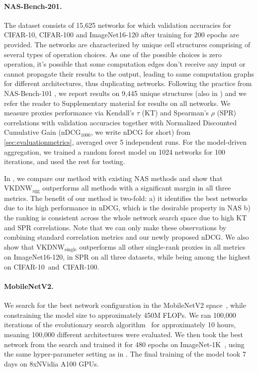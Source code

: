 \paragraph{NAS-Bench-201.} The dataset consists of 15,625 networks for which validation accuracies for CIFAR-10, CIFAR-100 \cite{krizhevsky2009learning} and ImageNet16-120 \cite{chrabaszcz2017downsampled} after training for 200 epochs are provided. The networks are characterized by unique cell structures comprising of several types of operation choices. As one of the possible choices is zero operation, it's possible that some computation edges don't receive any input or cannot propagate their results to the output, leading to same computation graphs for different architectures, thus duplicating networks. Following the practice from NAS-Bench-101 \cite{ying2019bench}, we report results on 9,445 unique structures (also in \cite{mehrotra2021bench, kadlecova2024surprisingly}) and we refer the reader to Supplementary material for results on all networks. 
We measure proxies performance via Kendall’s $\tau$ (KT) and Spearman's $\rho$ (SPR) correlations with validation accuracies together with Normalized Discounted Cumulative Gain ($\text{nDCG}_{1000}$, we write nDCG for short) from \cref{sec:evaluationmetrics}, averaged over 5 independent runs. For the model-driven aggregation, we trained a random forest model on 1024 networks for 100 iterations, and used the rest for testing.

In , we compare our method with existing NAS methods and show  that $\text{VKDNW}_{\text{agg}}$ outperforms all methods with a significant margin in all three metrics. The benefit of our method is two-fold: a) it identifies the best networks due to its high performance in $\text{nDCG}$, which is the desirable property in NAS b) the ranking is consistent across the whole network search space due to high KT and SPR correlations. Note that we can only make these observations by combining standard correlation metrics and our newly proposed $\text{nDCG}$. We also show that $\text{VKDNW}_{\text{single}}$ outperforms all other single-rank proxies in all metrics on ImageNet16-120, in SPR on all three datasets, while being among the highest on \mbox{CIFAR-10 and CIFAR-100}. 

\paragraph{MobileNetV2.}
We search for the best network configuration in the MobileNetV2 space~\cite{sandler2018mobilenetv2}, while constraining the model size to approximately 450M FLOPs. We ran 100,000 iterations of the evolutionary search algorithm~\cite{lee2024az} for approximately 10 hours, meaning 100,000 different architectures were evaluated. We then took the best network from the search and trained it for 480 epochs on  ImageNet-1K~\cite{deng2009imagenet}, using the same hyper-parameter setting as in \cite{lee2024az, li2023zico}. The final training of the model took 7 days on 8xNVidia A100 GPUs.

